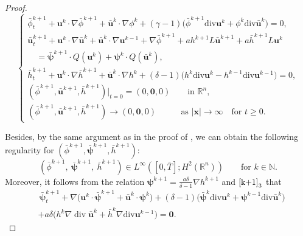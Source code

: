 \documentclass[11pt,reqno]{amsart}
\DeclareMathOperator{\diver}{\mathrm{div}}
\numberwithin{rk}{section}
\numberwithin{prop}{section}
\numberwithin{mydef}{section}
\numberwithin{lem}{section}
\numberwithin{equation}{section}
\numberwithin{thm}{section}
\begin{document}
\begin{proof}
\begin{equation}\label{k+3}
\begin{cases}
\displaystyle
\bar{\phi}^{k+1}_t+\boldsymbol{u}^k\cdot\nabla\bar{\phi}^{k+1}+\bar{\boldsymbol{u}}^k\cdot\nabla\phi^k+(\gamma-1)\big(\bar{\phi}^{k+1}\mathrm{div}\boldsymbol{u}^k+\phi^k\mathrm{div}\bar{\boldsymbol{u}}^k\big)=0,\\[4pt]
\displaystyle
\bar{\boldsymbol{u}}_t^{k+1}+\boldsymbol{u}^k\cdot\nabla \bar{\boldsymbol{u}}^k+\bar{\boldsymbol{u}}^k\cdot\nabla \boldsymbol{u}^{k-1}+\nabla\bar{\phi}^{k+1}
+ah^{k+1}L\bar{\boldsymbol{u}}^{k+1}+a\bar{h}^{k+1}L\boldsymbol{u}^{k}\\[2pt]
\displaystyle
\quad =\bar{\boldsymbol{\psi}}^{k+1}\cdot Q(\boldsymbol{u}^k)+\boldsymbol{\psi}^{k}\cdot Q(\bar{\boldsymbol{u}}^k),\\[2pt]
\displaystyle
\bar{h}^{k+1}_t+\boldsymbol{u}^k\cdot\nabla \bar{h}^{k+1}+\bar{\boldsymbol{u}}^k\cdot\nabla h^k+(\delta-1)\big(h^k\mathrm{div}{\boldsymbol{u}}^k-{h}^{k-1}\mathrm{div}\boldsymbol{u}^{k-1}\big)=0,\\[2pt]
\displaystyle
(\bar{\phi}^{k+1},\bar{\boldsymbol{u}}^{k+1},\bar{h}^{k+1})|_{t=0}=(0,\boldsymbol{0},0) \qquad\text{in $\mathbb{R}^n$},
\\[4pt]
\displaystyle
(\bar{\phi}^{k+1},\bar{\boldsymbol{u}}^{k+1},\bar{h}^{k+1})\to (0,\boldsymbol{0},0) \ \ \ \ \qquad\text{as $|\boldsymbol{x}|\to \infty$} \quad \text{for $t\geq 0$}.
\end{cases}
\end{equation}

Besides, by the same argument as in the proof of \cite[Lemma 3.11]{dxz}, we can obtain the following regularity for $(\bar{\phi}^{k+1},\bar{\boldsymbol{\psi}}^{k+1},\bar{h}^{k+1})$:
\begin{equation*} 
(\bar{\phi}^{k+1},\ \bar{\boldsymbol{\psi}}^{k+1}, \ \bar{h}^{k+1}) \in L^\infty([0,\bar{T}];H^2(\mathbb{R}^n)) \qquad \text{for $k\in \mathbb{N}$}.
\end{equation*}
Moreover, it follows from the relation $\boldsymbol{\psi}^{k+1}=\frac{a\delta}{\delta-1}\nabla h^{k+1}$ and $\eqref{k+1}_3$ that 
\begin{equation}\label{psibar1}
\begin{aligned}
&\,\bar{\boldsymbol{\psi}}^{k+1}_t+\nabla\big(\boldsymbol{u}^k\cdot \bar{\boldsymbol{\psi}}^{k+1}+\bar{\boldsymbol{u}}^k\cdot\boldsymbol{\psi}^k\big)+(\delta-1)\big(\bar{\boldsymbol{\psi}}^k\mathrm{div}\boldsymbol{u}^k+\boldsymbol{\psi}^{k-1}\mathrm{div}\bar{\boldsymbol{u}}^k\big)\\[2pt]
&+a\delta\big(h^k\nabla\diver \bar{\boldsymbol{u}}^k+\bar{h}^k\nabla\mathrm{div}\boldsymbol{u}^{k-1}\big)=\boldsymbol{0}.
\end{aligned}
\end{equation}


\end{proof}
\end{document}
